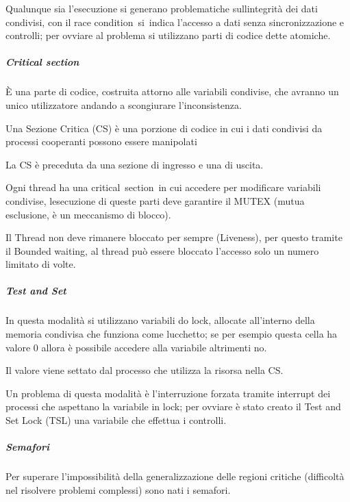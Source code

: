 \documentclass[
]{article}
\begin{document}
{}

{Qualunque sia l'esecuzione si generano problematiche
sull\textquotesingle integrità dei dati condivisi, con il }{race
condition}{~si}{~indica l'accesso a dati senza sincronizzazione e
controlli}{; per ovviare al problema si utilizzano parti di codice dette
atomiche.}

{}

\subparagraph{\texorpdfstring{{Critical
section}}{Critical section}}\label{h.9lse25s7e9of}

{È una parte di codice, costruita attorno alle variabili condivise, che
avranno un unico utilizzatore andando a scongiurare l'inconsistenza.}

{}

{Una Sezione Critica (CS) è una porzione di codice in cui i dati
condivisi da processi cooperanti possono essere manipolati }

{}

{La CS è preceduta da una sezione di ingresso e una di uscita.}

{Ogni thread ha una }{critical}{~}{section}{~in cui accedere per
modificare variabili condivise, l\textquotesingle esecuzione di queste
parti deve garantire il MUTEX (mutua esclusione, è un meccanismo di
blocco).}

{Il Thread non deve rimanere bloccato per sempre (Liveness), per questo
tramite il Bounded waiting, al thread può essere bloccato l'accesso solo
un numero limitato di volte.}

{}

\subparagraph{\texorpdfstring{{Test and
Set}}{Test and Set}}\label{h.msqqq0yz6w3h}

{In questa modalità si utilizzano variabili do lock, allocate
all'interno della memoria condivisa che funziona come lucchetto; se per
esempio questa cella ha valore 0 allora è possibile accedere alla
variabile altrimenti no.}

{Il valore viene settato dal processo che utilizza la risorsa nella CS.}

{}

{Un problema di questa modalità è l'interruzione forzata tramite
interrupt dei processi che aspettano la variabile in lock; per ovviare è
stato creato il Test and Set Lock (TSL) una variabile che effettua i
controlli.}

{}

\subparagraph{\texorpdfstring{{Semafori}}{Semafori}}\label{h.qkf29b2ix8jj}

{Per superare l'impossibilità della generalizzazione delle regioni
critiche (difficoltà nel risolvere problemi complessi) sono nati i
semafori.}
\end{document}
